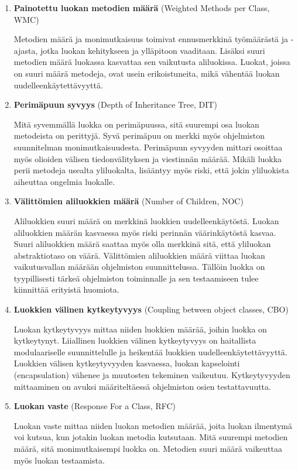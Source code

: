 \documentclass[finnish]{tktltiki2}
\theoremstyle{definition}
\theoremstyle{remark}
\begin{document}
\begin{enumerate}
  \item \textbf{Painotettu luokan metodien määrä} (Weighted Methods per Class, WMC)

  Metodien määrä ja monimutkaisuus toimivat ennusmerkkinä työmäärästä ja -ajasta, jotka luokan kehitykseen ja ylläpitoon vaaditaan. Lisäksi suuri metodien määrä luokassa kasvattaa sen vaikutusta aliluokissa. Luokat, joissa on suuri määrä metodeja, ovat usein erikoistuneita, mikä vähentää luokan uudelleenkäytettävyyttä.

  \item \textbf{Perimäpuun syvyys} (Depth of Inheritance Tree, DIT)

  Mitä syvemmällä luokka on perimäpuussa, sitä suurempi osa luokan metodeista on perittyjä. Syvä perimäpuu on merkki myös ohjelmiston suunnitelman monimutkaisuudesta. Perimäpuun syvyyden mittari osoittaa myös olioiden välisen tiedonvälityksen ja viestinnän määrää. Mikäli luokka perii metodeja usealta yliluokalta, lisääntyy myös riski, että jokin yliluokista aiheuttaa ongelmia luokalle.

  \item \textbf{Välittömien aliluokkien määrä} (Number of Children, NOC)

  Aliluokkien suuri määrä on merkkinä luokkien uudelleenkäytöstä. Luokan aliluokkien määrän kasvaessa myös riski perinnän väärinkäytöstä kasvaa. Suuri aliluokkien määrä saattaa myös olla merkkinä sitä, että yliluokan abstraktiotaso on väärä. Välittömien aliluokkien määrä viittaa luokan vaikutusvallan määrään ohjelmiston suunnittelussa. Tällöin luokka on tyypillisesti tärkeä ohjelmiston toiminnalle ja sen testaamiseen tulee kiinnittää erityistä huomiota.

  \item \textbf{Luokkien välinen kytkeytyvyys} (Coupling between object classes, CBO)

  Luokan kytkeytyvyys mittaa niiden luokkien määrää, joihin luokka on kytkeytynyt. Liiallinen luokkien välinen kytkeytyvyys on haitallista modulaariselle suunnittelulle ja heikentää luokkien uudelleenkäytettävyyttä. Luokkien välisen kytkeytyvyyden kasvaessa, luokan kapselointi (encapsulation) vähenee ja muutosten tekeminen vaikeutuu. Kytkeytyvyyden mittaaminen on avuksi määriteltäessä ohjelmiston osien testattavuutta.

  \item \textbf{Luokan vaste} (Response For a Class, RFC)

  Luokan vaste mittaa niiden luokan metodien määrää, joita luokan ilmentymä voi kutsua, kun jotakin luokan metodia kutsutaan. Mitä suurempi metodien määrä, sitä monimutkaisempi luokka on. Metodien suuri määrä vaikeuttaa myös luokan testaamista.


\end{enumerate}
\end{document}
